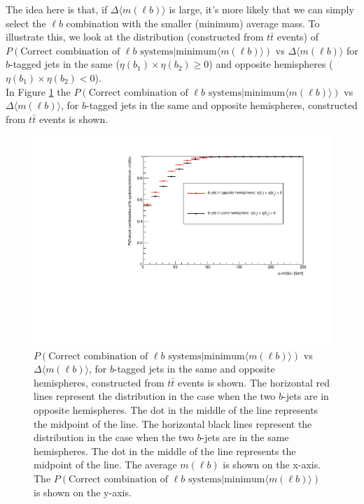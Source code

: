  The idea here is that, if $\Delta \langle m(\ell b) \rangle$ is large, it's more likely that we can simply select the $\ell b$ combination with the smaller (minimum) average mass. To illustrate this, we look at the distribution (constructed from $t\bar{t}$ events) of $P(\text{Correct combination of } \ell b \text{ systems} | \text{minimum} \langle m(\ell b) \rangle)$ vs $\Delta \langle m(\ell b) \rangle$ for $b$-tagged jets in the same ($\eta(b_{1}) \times \eta(b_{2}) \geq 0$) and opposite hemispheres ($\eta(b_{1}) \times \eta(b_{2}) < 0$).\\
 In Figure \ref{fig:lb-assoc} the $P(\text{Correct combination of } \ell b \text{ systems} | \text{minimum} \langle m(\ell b) \rangle)$ vs $\Delta \langle m(\ell b) \rangle$, for $b$-tagged jets in the same and opposite hemispheres, constructed from $t\bar{t}$ events is shown.
 \begin{figure}[h!]
	\includegraphics[width=0.6\linewidth]{figures/lbassoc_2vSM.pdf}
	\centering
	\caption{$P(\text{Correct combination of } \ell b \text{ systems} | \text{minimum} \langle m(\ell b) \rangle)$ vs $\Delta \langle m(\ell b) \rangle$, for $b$-tagged jets in the same and opposite hemispheres, constructed from $t\bar{t}$ events is shown. The horizontal red lines represent the distribution in the case when the two $b$-jets are in opposite hemispheres. The dot in the middle of the line represents the midpoint of the line. The horizontal black lines represent the distribution in the case when the two $b$-jets are in the same hemispheres. The dot in the middle of the line represents the midpoint of the line. The average $m(\ell b)$ is shown on the x-axis. The $P(\text{Correct combination of } \ell b \text{ systems} | \text{minimum} \langle m(\ell b) \rangle)$ is shown on the y-axis.}
	\label{fig:lb-assoc}
\end{figure}

